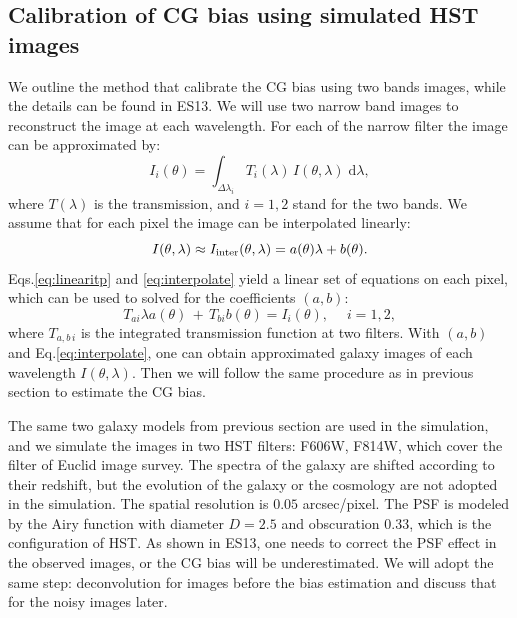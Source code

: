 \documentclass[useAMS,usenatbib]{mn2e}
\renewcommand{\d}{\mathrm{d}}
\newcommand{\be}{\begin{equation}}
\newcommand{\ee}{\end{equation}}
\def\elabel#1{\label{eq:#1}}
\begin{document}
\subsection{Calibration of CG bias using simulated HST images}

We outline the method that calibrate the CG bias using two bands
images, while the details can be found in ES13. We will use two narrow
band images to reconstruct the image at each wavelength. For each of
the narrow filter the image can be approximated by:
%
\be
I_i(\theta) = \int_{\Delta \lambda_i} T_i(\lambda)\, I(\theta,\lambda) \;\d \lambda,
\elabel{linearitp}
\ee
%
where $T(\lambda)$ is the transmission, and $i=1,2$ stand for the two bands.
We assume that for each pixel the image can be interpolated linearly:
%
\be
I(\theta,\lambda) \approx
I_{\rm inter}(\theta,\lambda)=a(\theta)\lambda + b(\theta).
\elabel{interpolate}
\ee
%
Eqs.\ref{eq:linearitp} and \ref{eq:interpolate} yield a linear set of
equations on each pixel, which can be used to solved for the
coefficients $(a,b)$:
%
\be
T_{ai} \lambda a(\theta) \,+\,T_{bi} b(\theta) = I_i(\theta), \quad\; i=1,2,
\elabel{lineareq}
\ee
%
where $T_{a,b\,i}$ is the integrated transmission function at two
filters. With $(a,b)$ and Eq.\ref{eq:interpolate}, one can obtain
approximated galaxy images of each wavelength
$I(\theta,\lambda)$. Then we will follow the same procedure as in
previous section to estimate the CG bias.

The same two galaxy models from previous section are used in the
simulation, and we simulate the images in two HST filters: F606W,
F814W, which cover the filter of Euclid image survey. The spectra of
the galaxy are shifted according to their redshift, but the evolution
of the galaxy or the cosmology are not adopted in the simulation. The
spatial resolution is $0.05$ arcsec/pixel. The PSF is modeled by the
Airy function with diameter $D=2.5$ and obscuration $0.33$, which is
the configuration of HST. As shown in ES13, one needs to correct the
PSF effect in the observed images, or the CG bias will be
underestimated. We will adopt the same step: deconvolution for images
before the bias estimation and discuss that for the noisy images
later.
\end{document}
